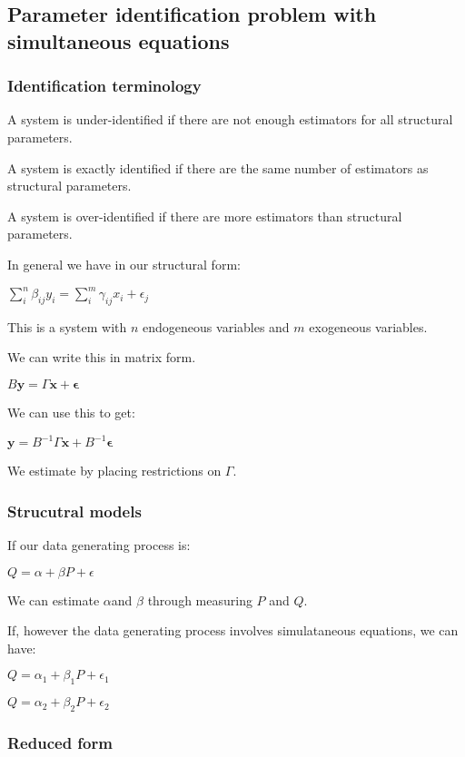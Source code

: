 
\subsection{Parameter identification problem with simultaneous equations}

\subsubsection{Identification terminology}

A system is under-identified if there are not enough estimators for all structural parameters.

A system is exactly identified if there are the same number of estimators as structural parameters.

A system is over-identified if there are more estimators than structural parameters.

In general we have in our structural form:

\(\sum^n_i\beta_{ij}y_i=\sum^m_i\gamma_{ij}x_i+\epsilon_j\)

This is a system with \(n\) endogeneous variables and \(m\) exogeneous variables.

We can write this in matrix form.

\(B\mathbf y =\Gamma \mathbf{x} + \mathbf{\epsilon}\)

We can use this to get:

\(\mathbf{y} =B^{-1}\Gamma \mathbf{x} + B^{-1}\mathbf{ \epsilon}\)

We estimate by placing restrictions on \(\Gamma\).

\subsubsection{Strucutral models}

If our data generating process is:

\(Q=\alpha + \beta P +\epsilon \)

We can estimate \(\alpha \)and \(\beta \) through measuring \(P\) and \(Q\).

If, however the data generating process involves simulataneous equations, we can have:

\(Q=\alpha_1 + \beta_1 P + \epsilon_1 \)

\(Q=\alpha_2 + \beta_2 P + \epsilon_2 \)

\subsubsection{Reduced form}

